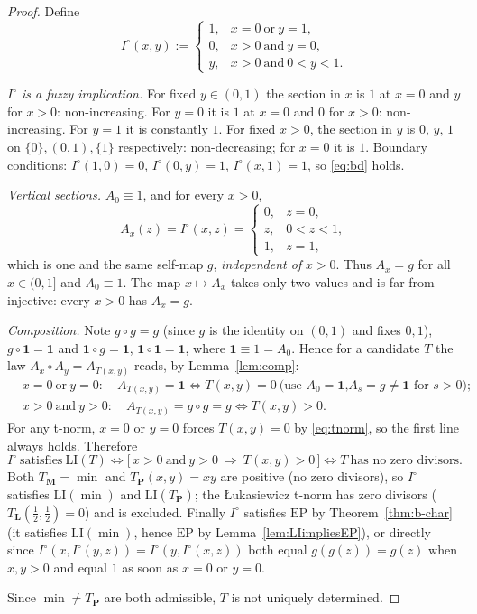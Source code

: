 \documentclass{amsart}
\theoremstyle{definition}
\theoremstyle{remark}
\newcommand{\LI}{\mathrm{LI}}
\newcommand{\EP}{\mathrm{EP}}
\newcommand{\Ax}{A}
\begin{document}
\begin{proof}
Define
\[
I^{\circ}(x,y):=\begin{cases}1,& x=0\ \text{or}\ y=1,\\[1mm] 0,& x>0\ \text{and}\ y=0,\\[1mm]
y,& x>0\ \text{and}\ 0<y<1.\end{cases}
\]

\emph{$I^{\circ}$ is a fuzzy implication.} For fixed $y\in(0,1)$ the section in $x$ is
$1$ at $x=0$ and $y$ for $x>0$: non-increasing. For $y=0$ it is $1$ at $x=0$ and $0$ for
$x>0$: non-increasing. For $y=1$ it is constantly $1$. For fixed $x>0$, the section in $y$ is
$0,\,y,\,1$ on $\{0\},(0,1),\{1\}$ respectively: non-decreasing; for $x=0$ it is $1$. Boundary
conditions: $I^{\circ}(1,0)=0$, $I^{\circ}(0,y)=1$, $I^{\circ}(x,1)=1$, so \eqref{eq:bd} holds.

\emph{Vertical sections.} $\Ax_0\equiv1$, and for every $x>0$,
\[
\Ax_x(z)=I^{\circ}(x,z)=\begin{cases}0,& z=0,\\ z,& 0<z<1,\\ 1,& z=1,\end{cases}
\]
which is one and the same self-map $g$, \emph{independent of} $x>0$. Thus
$\Ax_x=g$ for all $x\in(0,1]$ and $\Ax_0\equiv1$. The map $x\mapsto\Ax_x$ takes only two
values and is far from injective: every $x>0$ has $\Ax_x=g$.

\emph{Composition.} Note $g\circ g=g$ (since $g$ is the identity on $(0,1)$ and fixes $0,1$),
$g\circ\mathbf 1=\mathbf 1$ and $\mathbf 1\circ g=\mathbf 1$, $\mathbf 1\circ\mathbf 1=\mathbf
1$, where $\mathbf 1\equiv1=\Ax_0$. Hence for a candidate $T$ the law
$\Ax_x\circ\Ax_y=\Ax_{T(x,y)}$ reads, by Lemma~\ref{lem:comp}:
\[
\begin{aligned}
&x=0\ \text{or}\ y=0:\quad \Ax_{T(x,y)}=\mathbf 1\iff T(x,y)=0\ \text{(use $\Ax_0=\mathbf1$,
$\Ax_s=g\neq\mathbf1$ for $s>0$)};\\
&x>0\ \text{and}\ y>0:\quad \Ax_{T(x,y)}=g\circ g=g\iff T(x,y)>0 .
\end{aligned}
\]
For any t-norm, $x=0$ or $y=0$ forces $T(x,y)=0$ by \eqref{eq:tnorm}, so the first line
always holds. Therefore
\[
I^{\circ}\ \text{satisfies}\ \LI(T)\iff
\bigl[\,x>0\ \text{and}\ y>0\ \Rightarrow\ T(x,y)>0\,\bigr]\iff T\ \text{has no zero divisors}.
\]
Both $T_{\mathbf M}=\min$ and $T_{\mathbf P}(x,y)=xy$ are positive (no zero divisors), so
$I^{\circ}$ satisfies $\LI(\min)$ and $\LI(T_{\mathbf P})$; the \L ukasiewicz t-norm has zero
divisors ($T_{\mathbf L}(\tfrac12,\tfrac12)=0$) and is excluded. Finally
$I^{\circ}$ satisfies $\EP$ by Theorem~\ref{thm:b-char} (it satisfies $\LI(\min)$, hence
$\EP$ by Lemma~\ref{lem:LIimpliesEP}), or directly since
$I^{\circ}(x,I^{\circ}(y,z))=I^{\circ}(y,I^{\circ}(x,z))$ both equal $g(g(z))=g(z)$ when
$x,y>0$ and equal $1$ as soon as $x=0$ or $y=0$.

Since $\min\neq T_{\mathbf P}$ are both admissible, $T$ is not uniquely determined.
\end{proof}
\end{document}
